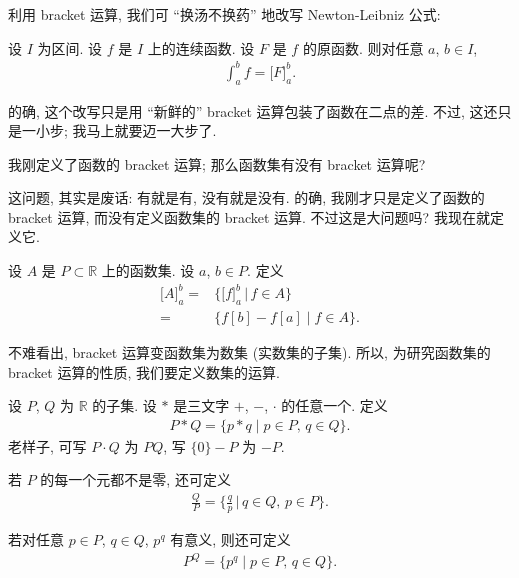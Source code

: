 利用 bracket 运算, 我们可 ``换汤不换药'' 地改写 Newton-Leibniz 公式:

\begin{theorem}
    设 $I$ 为区间. 设 $f$ 是 $I$ 上的连续函数. 设 $F$ 是 $f$ 的原函数. 则对任意 $a$, $b \in I$,
    \begin{align*}
        \int_{a}^{b} {f} = \big[ F \big]_{a}^{b}.
    \end{align*}
\end{theorem}

的确, 这个改写只是用 ``新鲜的'' bracket 运算包装了函数在二点的差. 不过, 这还只是一小步; 我马上就要迈一大步了.

我刚定义了函数的 bracket 运算; 那么函数集有没有 bracket 运算呢?

这问题, 其实是废话: 有就是有, 没有就是没有. 的确, 我刚才只是定义了函数的 bracket 运算, 而没有定义函数集的 bracket 运算. 不过这是大问题吗? 我现在就定义它.

\begin{definition}
    设 $A$ 是 $P \subset \mathbb{R}$ 上的函数集. 设 $a$, $b \in P$. 定义
    \begin{align*}
        \big[ A \big]_{a}^{b}
        = {} & \bigg\{ \big[ f \big]_{a}^{b} \,\bigg|\, f \in A \bigg\} \\
        = {} & \{ f[b] - f[a] \mid f \in A \}.
    \end{align*}
\end{definition}

不难看出, bracket 运算变函数集为数集 (实数集的子集). 所以, 为研究函数集的 bracket 运算的性质, 我们要定义数集的运算.

\begin{definition}
    设 $P$, $Q$ 为 $\mathbb{R}$ 的子集. 设 $\ast$ 是三文字 $+$, $-$, $\cdot$ 的任意一个. 定义
    \begin{align*}
        P \ast Q = \{ p \ast q \mid \text{$p \in P$, $q \in Q$} \}.
    \end{align*}
    老样子, 可写 $P \cdot Q$ 为 $PQ$, 写 $\{ 0 \} - P$ 为 $-P$.

    若 $P$ 的每一个元都不是零, 还可定义
    \begin{align*}
        \frac{Q}{P} = \Bigg\{ \frac{q}{p} \,\Bigg|\,  \text{$q \in Q$, $p \in P$} \Bigg\}.
    \end{align*}

    若对任意 $p \in P$, $q \in Q$, $p^q$ 有意义, 则还可定义
    \begin{align*}
        P^Q = \{ p^q \mid \text{$p \in P$, $q \in Q$} \}.
    \end{align*}
\end{definition}

